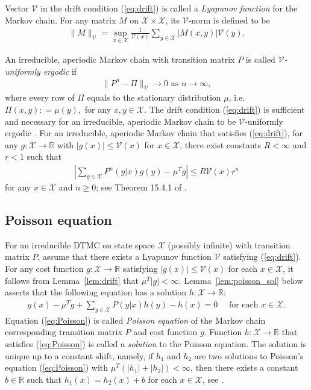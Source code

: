 \documentclass[11pt]{article}
\newcommand{\R}{\mathbb{R}}
\newcommand{\X}{\mathcal{X}}
\newcommand{\V}{\mathcal{V}}
\providecommand{\abs}[1]{\lvert#1\rvert}
\theoremstyle{definition}
\numberwithin{equation}{section}
\begin{document}
Vector $\V$ in the drift condition (\ref{eq:drift}) is called a
\textit{Lyapunov function} for the Markov chain.
For any matrix $M$ on $\X\times \X$, its $\V$-norm is defined to be
 \begin{align*}
   \|M\|_\V^{ } = \sup\limits_{x\in \X} \frac{1}{\V(x)}\sum\limits_{y\in \X}|M(x, y)| \V(y).
\end{align*}


An irreducible, aperiodic Markov chain with transition matrix $P$ is
called \textit{$\V$-uniformly ergodic} if
\begin{align*}\|P^n - \Pi\|_\V^{ }\rightarrow 0 \text{ as } n\rightarrow
  \infty,\end{align*} where every row of $ \Pi$ equals to the
stationary distribution $\mu$, i.e. $\Pi(x, y): = \mu(y),$ for any
$x, y\in \X$.  The drift condition (\ref{eq:drift}) is sufficient and
necessary for an irreducible, aperiodic Markov chain to be
$\V$-uniformly ergodic \cite[Theorem 16.0.1]{Meyn2009}.  For an
irreducible, aperiodic Markov chain that satisfies (\ref{eq:drift}),
for any $g:\X\to \R$ with $\abs{g(x)}\le \V(x)$ for $x\in \X$, there
exist constants $R<\infty$ and $r<1$ such that
\begin{align}\label{eq:geo}
\left| \sum\limits_{y\in \X} P^n(y|x) g(y) - \mu^T g  \right| \leq R\V(x) r^n
\end{align}
for any $x\in \X$ and $n\geq 0$; see  Theorem 15.4.1 of \cite{Meyn2009}.


















\subsection{Poisson equation}\label{sec:PO}
For an irreducible DTMC on state space $\X$ (possibly infinite) with transition matrix $P$,
assume that there exists a Lyapunov function $\V$ satisfying (\ref{eq:drift}).
For any cost function $g:\X \rightarrow \R$ satisfying $\abs{g(x)}\le \V(x)$ for each $x\in \X$, it follows from Lemma~\ref{lem:drift} that $\mu^T |g|<\infty$.
Lemma~\ref{lem:poisson_sol} below asserts that the following equation
has a solution $h:\X\to\R$:
\begin{align}\label{eq:Poisson}
g(x) - \mu^T g + \sum\limits_{y\in \X}P(y|x) h(y) - h(x) =0 \quad \text{ for each }x\in \X.
\end{align}
Equation (\ref{eq:Poisson}) is called  \textit{Poisson equation} of the Markov chain corresponding transition matrix $P$ and cost function $g $. Function $h:\X\rightarrow \R$ that satisfies (\ref{eq:Poisson}) is called a \textit{solution} to the Poisson equation.  The solution is unique up to a constant shift, namely,
if $h_1$ and $h_2$ are two solutions to Poisson's equation (\ref{eq:Poisson}) with $\mu^T(|h_1|+|h_2|)<\infty$, then there exists a constant $b\in \R$ such that $h_1(x) = h_2(x) +b$ for each $x\in \X$, see \cite[Proposition 17.4.1]{Meyn2009}.
\end{document}

